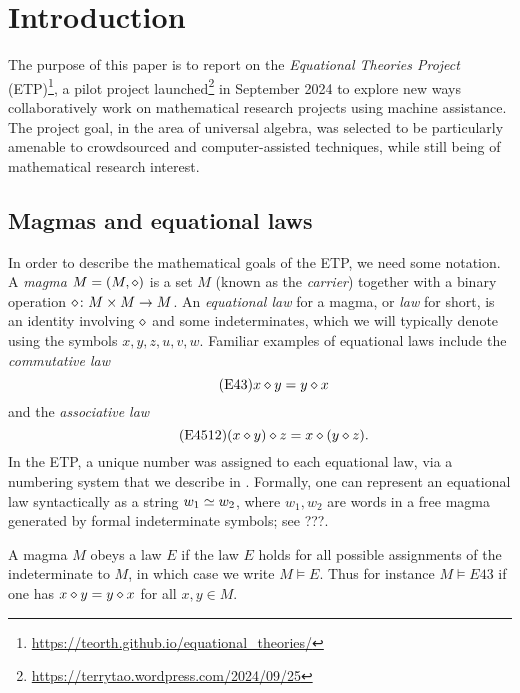 \section{Introduction}

The purpose of this paper is to report on the \emph{Equational Theories Project} (ETP)\footnote{\url{https://teorth.github.io/equational_theories/}}, a pilot project launched\footnote{\url{https://terrytao.wordpress.com/2024/09/25}} in September 2024 to explore new ways collaboratively work on mathematical research projects using machine assistance.  The project goal, in the area of universal algebra, was selected to be particularly amenable to crowdsourced and computer-assisted techniques, while still being of mathematical research interest.  

\subsection{Magmas and equational laws}

In order to describe the mathematical goals of the ETP, we need some notation.  A \emph{magma} $M = (M,\diamond)$ is a set $M$ (known as the \emph{carrier}) together with a binary operation $\diamond \colon M \times M \to M$.  An \emph{equational law} for a magma, or \emph{law} for short, is an identity involving $\diamond$ and some indeterminates, which we will typically denote using the symbols $x,y,z,u,v,w$.  Familiar examples of equational laws include the \emph{commutative law}
\begin{equation}\label{eq43}\tag{E43}
    x \diamond y = y \diamond x
\end{equation}
and the \emph{associative law}
\begin{equation}\label{eq4512}\tag{E4512}
    (x \diamond y) \diamond z = x \diamond (y \diamond z).
\end{equation}
In the ETP, a unique number was assigned to each equational law, via a numbering system that we describe in .  Formally, one can represent an equational law syntactically as a string $w_1 \simeq w_2$, where $w_1, w_2$ are words in a free magma generated by formal indeterminate symbols; see ???.

A magma $M$ obeys a law $E$ if the law $E$ holds for all possible assignments of the indeterminate to $M$, in which case we write $M \models E$.  Thus for instance $M \models E43$ if one has $x \diamond y = y \diamond x$ for all $x,y \in M$.

